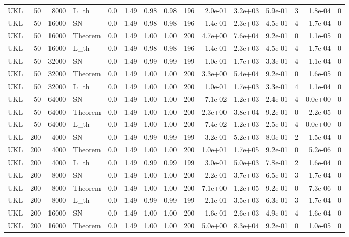 \begin{tabular}{lrrlrrrrrrrrrrr}
UKL & 50 & 8000 & L\_th & 0.0 & 1.49 & 0.98 & 0.98 & 196 & 2.0e-01 & 3.2e+03 & 5.9e-01 & 3 & 1.8e-04 & 0 \\
UKL & 50 & 16000 & SN & 0.0 & 1.49 & 0.98 & 0.98 & 196 & 1.4e-01 & 2.3e+03 & 4.5e-01 & 4 & 1.7e-04 & 0 \\
UKL & 50 & 16000 & Theorem & 0.0 & 1.49 & 1.00 & 1.00 & 200 & 4.7e+00 & 7.6e+04 & 9.2e-01 & 0 & 1.1e-05 & 0 \\
UKL & 50 & 16000 & L\_th & 0.0 & 1.49 & 0.98 & 0.98 & 196 & 1.4e-01 & 2.3e+03 & 4.5e-01 & 4 & 1.7e-04 & 0 \\
UKL & 50 & 32000 & SN & 0.0 & 1.49 & 0.99 & 0.99 & 199 & 1.0e-01 & 1.7e+03 & 3.3e-01 & 4 & 1.1e-04 & 0 \\
UKL & 50 & 32000 & Theorem & 0.0 & 1.49 & 1.00 & 1.00 & 200 & 3.3e+00 & 5.4e+04 & 9.2e-01 & 0 & 1.6e-05 & 0 \\
UKL & 50 & 32000 & L\_th & 0.0 & 1.49 & 1.00 & 1.00 & 200 & 1.0e-01 & 1.7e+03 & 3.3e-01 & 4 & 1.1e-04 & 0 \\
UKL & 50 & 64000 & SN & 0.0 & 1.49 & 1.00 & 1.00 & 200 & 7.1e-02 & 1.2e+03 & 2.4e-01 & 4 & 0.0e+00 & 0 \\
UKL & 50 & 64000 & Theorem & 0.0 & 1.49 & 1.00 & 1.00 & 200 & 2.3e+00 & 3.8e+04 & 9.2e-01 & 0 & 2.2e-05 & 0 \\
UKL & 50 & 64000 & L\_th & 0.0 & 1.49 & 1.00 & 1.00 & 200 & 7.4e-02 & 1.2e+03 & 2.5e-01 & 4 & 0.0e+00 & 0 \\
UKL & 200 & 4000 & SN & 0.0 & 1.49 & 0.99 & 0.99 & 199 & 3.2e-01 & 5.2e+03 & 8.0e-01 & 2 & 1.5e-04 & 0 \\
UKL & 200 & 4000 & Theorem & 0.0 & 1.49 & 1.00 & 1.00 & 200 & 1.0e+01 & 1.7e+05 & 9.2e-01 & 0 & 5.2e-06 & 0 \\
UKL & 200 & 4000 & L\_th & 0.0 & 1.49 & 0.99 & 0.99 & 199 & 3.0e-01 & 5.0e+03 & 7.8e-01 & 2 & 1.6e-04 & 0 \\
UKL & 200 & 8000 & SN & 0.0 & 1.49 & 1.00 & 1.00 & 200 & 2.2e-01 & 3.7e+03 & 6.5e-01 & 3 & 1.7e-04 & 0 \\
UKL & 200 & 8000 & Theorem & 0.0 & 1.49 & 1.00 & 1.00 & 200 & 7.1e+00 & 1.2e+05 & 9.2e-01 & 0 & 7.3e-06 & 0 \\
UKL & 200 & 8000 & L\_th & 0.0 & 1.49 & 0.99 & 0.99 & 199 & 2.1e-01 & 3.5e+03 & 6.3e-01 & 3 & 1.7e-04 & 0 \\
UKL & 200 & 16000 & SN & 0.0 & 1.49 & 1.00 & 1.00 & 200 & 1.6e-01 & 2.6e+03 & 4.9e-01 & 4 & 1.6e-04 & 0 \\
UKL & 200 & 16000 & Theorem & 0.0 & 1.49 & 1.00 & 1.00 & 200 & 5.0e+00 & 8.3e+04 & 9.2e-01 & 0 & 1.0e-05 & 0 \\

\end{tabular}
